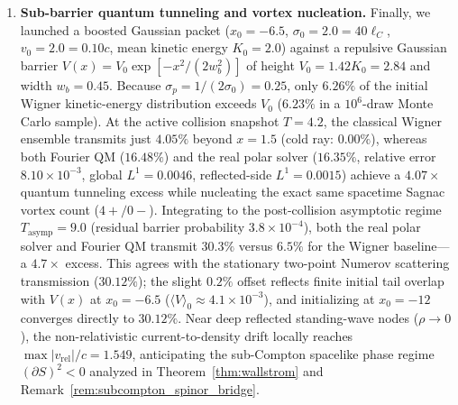 \documentclass[11pt, a4paper]{article}
\theoremstyle{definition}
\begin{document}
\begin{enumerate}[label=\textbf{Experiment \arabic*:}, leftmargin=2.5cm]
    \item \textbf{Sub-barrier quantum tunneling and vortex nucleation.} Finally, we launched a boosted Gaussian packet ($x_0 = -6.5$, $\sigma_0 = 2.0 = 40\ell_C$, $v_0 = 2.0 = 0.10c$, mean kinetic energy $K_0 = 2.0$) against a repulsive Gaussian barrier $V(x) = V_0\exp[-x^2/(2w_b^2)]$ of height $V_0 = 1.42 K_0 = 2.84$ and width $w_b = 0.45$. Because $\sigma_p = 1/(2\sigma_0) = 0.25$, only $6.26\%$ of the initial Wigner kinetic-energy distribution exceeds $V_0$ ($6.23\%$ in a $10^6$-draw Monte Carlo sample). At the active collision snapshot $T = 4.2$, the classical Wigner ensemble transmits just $4.05\%$ beyond $x = 1.5$ (cold ray: $0.00\%$), whereas both Fourier QM ($16.48\%$) and the real polar solver ($16.35\%$, relative error $8.10 \times 10^{-3}$, global $L^1 = 0.0046$, reflected-side $L^1 = 0.0015$) achieve a $4.07\times$ quantum tunneling excess while nucleating the exact same spacetime Sagnac vortex count ($4+/0-$). Integrating to the post-collision asymptotic regime $T_{\text{asymp}} = 9.0$ (residual barrier probability $3.8 \times 10^{-4}$), both the real polar solver and Fourier QM transmit $30.3\%$ versus $6.5\%$ for the Wigner baseline---a $4.7\times$ excess. This agrees with the stationary two-point Numerov scattering transmission ($30.12\%$); the slight $0.2\%$ offset reflects finite initial tail overlap with $V(x)$ at $x_0 = -6.5$ ($\langle V \rangle_0 \approx 4.1 \times 10^{-3}$), and initializing at $x_0 = -12$ converges directly to $30.12\%$. Near deep reflected standing-wave nodes ($\rho \to 0$), the non-relativistic current-to-density drift locally reaches $\max|v_{\text{rel}}|/c = 1.549$, anticipating the sub-Compton spacelike phase regime $(\partial S)^2 < 0$ analyzed in Theorem~\ref{thm:wallstrom} and Remark~\ref{rem:subcompton_spinor_bridge}.
\end{enumerate}
\end{document}
